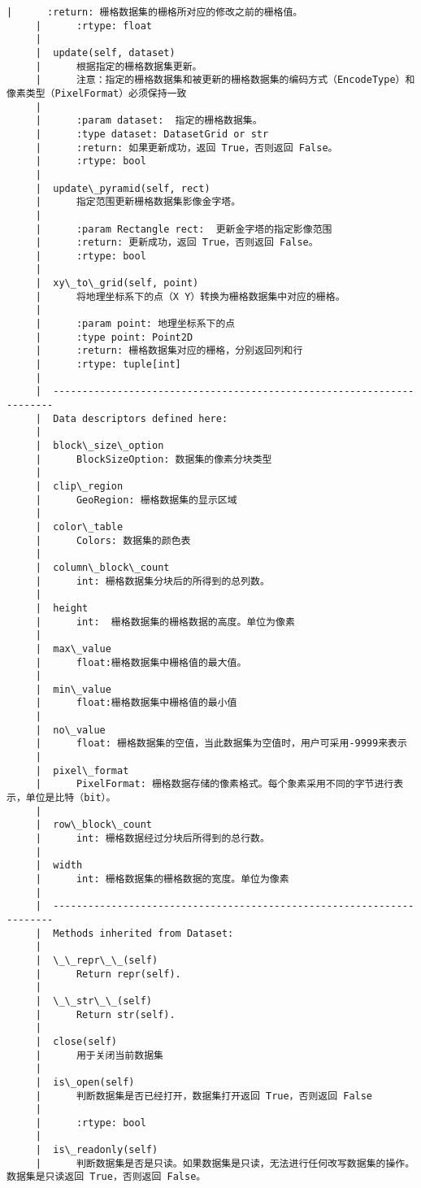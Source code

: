 \documentclass[11pt]{article}
\begin{document}
\begin{Verbatim}[commandchars=\\\{\}]
     |      :return: 栅格数据集的栅格所对应的修改之前的栅格值。
     |      :rtype: float
     |  
     |  update(self, dataset)
     |      根据指定的栅格数据集更新。
     |      注意：指定的栅格数据集和被更新的栅格数据集的编码方式（EncodeType）和像素类型（PixelFormat）必须保持一致
     |      
     |      :param dataset:  指定的栅格数据集。
     |      :type dataset: DatasetGrid or str
     |      :return: 如果更新成功，返回 True，否则返回 False。
     |      :rtype: bool
     |  
     |  update\_pyramid(self, rect)
     |      指定范围更新栅格数据集影像金字塔。
     |      
     |      :param Rectangle rect:  更新金字塔的指定影像范围
     |      :return: 更新成功，返回 True，否则返回 False。
     |      :rtype: bool
     |  
     |  xy\_to\_grid(self, point)
     |      将地理坐标系下的点（X Y）转换为栅格数据集中对应的栅格。
     |      
     |      :param point: 地理坐标系下的点
     |      :type point: Point2D
     |      :return: 栅格数据集对应的栅格，分别返回列和行
     |      :rtype: tuple[int]
     |  
     |  ----------------------------------------------------------------------
     |  Data descriptors defined here:
     |  
     |  block\_size\_option
     |      BlockSizeOption: 数据集的像素分块类型
     |  
     |  clip\_region
     |      GeoRegion: 栅格数据集的显示区域
     |  
     |  color\_table
     |      Colors: 数据集的颜色表
     |  
     |  column\_block\_count
     |      int: 栅格数据集分块后的所得到的总列数。
     |  
     |  height
     |      int:  栅格数据集的栅格数据的高度。单位为像素
     |  
     |  max\_value
     |      float:栅格数据集中栅格值的最大值。
     |  
     |  min\_value
     |      float:栅格数据集中栅格值的最小值
     |  
     |  no\_value
     |      float: 栅格数据集的空值，当此数据集为空值时，用户可采用-9999来表示
     |  
     |  pixel\_format
     |      PixelFormat: 栅格数据存储的像素格式。每个象素采用不同的字节进行表示，单位是比特（bit）。
     |  
     |  row\_block\_count
     |      int: 栅格数据经过分块后所得到的总行数。
     |  
     |  width
     |      int: 栅格数据集的栅格数据的宽度。单位为像素
     |  
     |  ----------------------------------------------------------------------
     |  Methods inherited from Dataset:
     |  
     |  \_\_repr\_\_(self)
     |      Return repr(self).
     |  
     |  \_\_str\_\_(self)
     |      Return str(self).
     |  
     |  close(self)
     |      用于关闭当前数据集
     |  
     |  is\_open(self)
     |      判断数据集是否已经打开，数据集打开返回 True，否则返回 False
     |      
     |      :rtype: bool
     |  
     |  is\_readonly(self)
     |      判断数据集是否是只读。如果数据集是只读，无法进行任何改写数据集的操作。 数据集是只读返回 True，否则返回 False。

\end{Verbatim}
\end{document}
